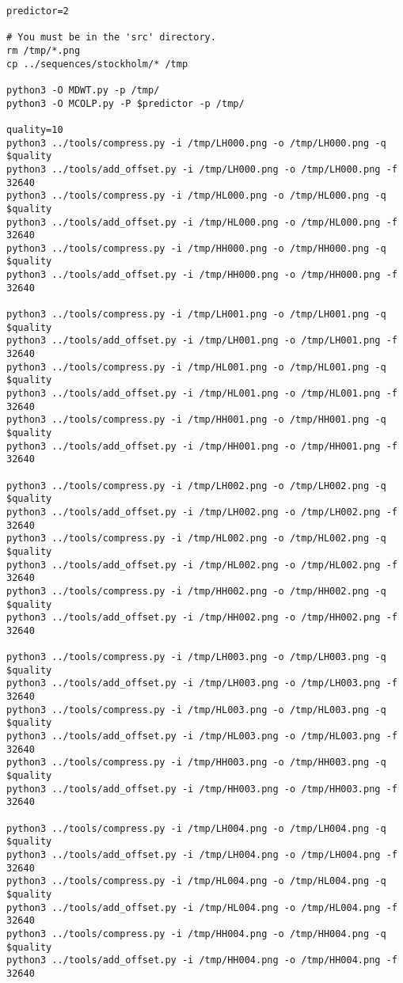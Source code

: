 \begin{verbatim}
predictor=2

# You must be in the 'src' directory.
rm /tmp/*.png
cp ../sequences/stockholm/* /tmp

python3 -O MDWT.py -p /tmp/
python3 -O MCOLP.py -P $predictor -p /tmp/

quality=10
python3 ../tools/compress.py -i /tmp/LH000.png -o /tmp/LH000.png -q $quality
python3 ../tools/add_offset.py -i /tmp/LH000.png -o /tmp/LH000.png -f 32640
python3 ../tools/compress.py -i /tmp/HL000.png -o /tmp/HL000.png -q $quality
python3 ../tools/add_offset.py -i /tmp/HL000.png -o /tmp/HL000.png -f 32640
python3 ../tools/compress.py -i /tmp/HH000.png -o /tmp/HH000.png -q $quality
python3 ../tools/add_offset.py -i /tmp/HH000.png -o /tmp/HH000.png -f 32640

python3 ../tools/compress.py -i /tmp/LH001.png -o /tmp/LH001.png -q $quality
python3 ../tools/add_offset.py -i /tmp/LH001.png -o /tmp/LH001.png -f 32640
python3 ../tools/compress.py -i /tmp/HL001.png -o /tmp/HL001.png -q $quality
python3 ../tools/add_offset.py -i /tmp/HL001.png -o /tmp/HL001.png -f 32640
python3 ../tools/compress.py -i /tmp/HH001.png -o /tmp/HH001.png -q $quality
python3 ../tools/add_offset.py -i /tmp/HH001.png -o /tmp/HH001.png -f 32640

python3 ../tools/compress.py -i /tmp/LH002.png -o /tmp/LH002.png -q $quality
python3 ../tools/add_offset.py -i /tmp/LH002.png -o /tmp/LH002.png -f 32640
python3 ../tools/compress.py -i /tmp/HL002.png -o /tmp/HL002.png -q $quality
python3 ../tools/add_offset.py -i /tmp/HL002.png -o /tmp/HL002.png -f 32640
python3 ../tools/compress.py -i /tmp/HH002.png -o /tmp/HH002.png -q $quality
python3 ../tools/add_offset.py -i /tmp/HH002.png -o /tmp/HH002.png -f 32640

python3 ../tools/compress.py -i /tmp/LH003.png -o /tmp/LH003.png -q $quality
python3 ../tools/add_offset.py -i /tmp/LH003.png -o /tmp/LH003.png -f 32640
python3 ../tools/compress.py -i /tmp/HL003.png -o /tmp/HL003.png -q $quality
python3 ../tools/add_offset.py -i /tmp/HL003.png -o /tmp/HL003.png -f 32640
python3 ../tools/compress.py -i /tmp/HH003.png -o /tmp/HH003.png -q $quality
python3 ../tools/add_offset.py -i /tmp/HH003.png -o /tmp/HH003.png -f 32640

python3 ../tools/compress.py -i /tmp/LH004.png -o /tmp/LH004.png -q $quality
python3 ../tools/add_offset.py -i /tmp/LH004.png -o /tmp/LH004.png -f 32640
python3 ../tools/compress.py -i /tmp/HL004.png -o /tmp/HL004.png -q $quality
python3 ../tools/add_offset.py -i /tmp/HL004.png -o /tmp/HL004.png -f 32640
python3 ../tools/compress.py -i /tmp/HH004.png -o /tmp/HH004.png -q $quality
python3 ../tools/add_offset.py -i /tmp/HH004.png -o /tmp/HH004.png -f 32640


\end{verbatim}
